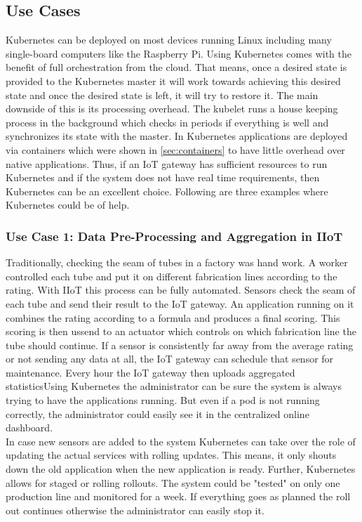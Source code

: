 \subsection{Use Cases}
Kubernetes can be deployed on most devices running Linux including many single-board computers like the Raspberry Pi. Using Kubernetes comes with the benefit of full orchestration from the cloud. That means, once a desired state is provided to the Kubernetes master it will work towards achieving this desired state and once the desired state is left, it will try to restore it. The main downside of this is its processing overhead. The kubelet runs a house keeping process in the background which checks in periods if everything is well and synchronizes its state with the master. In Kubernetes applications are deployed via containers which were shown in \cref{sec:containers} to have little overhead over native applications.
Thus, if an IoT gateway has sufficient resources to run Kubernetes and if the system does not have real time requirements, then Kubernetes can be an excellent choice. Following are three examples where Kubernetes could be of help. 

\subsubsection{Use Case 1: Data Pre-Processing and Aggregation in IIoT}
Traditionally, checking the seam of tubes in a factory was hand work. A worker controlled each tube and put it on different fabrication lines according to the rating. With IIoT this process can be fully automated. Sensors check the seam of each tube and send their result to the IoT gateway. An application running on it combines the rating according to a formula and produces a final scoring. This scoring is then ussend to an actuator which controls on which fabrication line the tube should continue. If a sensor is consistently far away from the average rating or not sending any data at all, the IoT gateway can schedule that sensor for maintenance. Every hour the IoT gateway then uploads aggregated statisticsUsing Kubernetes the administrator can be sure the system is always trying to have the applications running. But even if a pod is not running correctly, the administrator could easily see it in the centralized online dashboard. \\
In case new sensors are added to the system Kubernetes can take over the role of updating the actual services with rolling updates. This means, it only shouts down the old application when the new application is ready. Further, Kubernetes allows for staged or rolling rollouts. The system could be "tested" on only one production line and monitored for a week. If everything goes as planned the roll out continues otherwise the administrator can easily stop it. 

